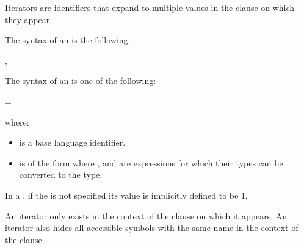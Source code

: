 Iterators are identifiers that expand to multiple values in the clause on which they appear.

The syntax of an  is the following:
\begin{ompSyntax}
\plc{iterator-specifier [}, \plc{iterators-definition ]}
\end{ompSyntax}

The syntax of an  is one of the following:
\begin{indentedcodelist}
  = 
\end{indentedcodelist}

where:
\begin{itemize}
\item {} is a base language identifier.

\item {} is of the form \code{:}\plc{end[}\code{:}\plc{step]} where ,  and  are expressions for which their types can be converted to the  type.



\end{itemize}

In a , if the  is not specified its value is implicitly defined to be 1.

An iterator only exists in the context of the clause on which it appears. An iterator also hides all accessible symbols with the same name in the context of the clause.

